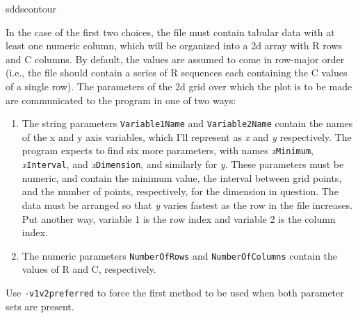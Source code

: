 \begin{sddsprog}{sddscontour}
\begin{itemize}
        In the case of the first two choices, the file must contain
tabular data with at least one numeric column, which will be organized
into a 2d array with R rows and C columns.  By default, the values are
assumed to come in row-major order (i.e., the file should contain a
series of R sequences each containing the C values of a single row).
The parameters of the 2d grid over which the plot is to be made are
communicated to the program in one of two ways:

\begin{enumerate}

\item The string parameters \verb|Variable1Name| and \verb|Variable2Name| contain the names of the
x and y axis variables, which I'll represent as {\em x} and {\em y} respectively.  The program expects to find
six more parameters, with names {\em x}\verb|Minimum|, {\em x}\verb|Interval|, and {\em x}\verb|Dimension|,
and similarly for {\em y}.  These parameters must be numeric, and contain the minimum value, the interval
between grid points, and the number of points, respectively, for the dimension in question.
The data must be arranged so that {\em y} varies fastest as the row in the file increases.  Put another
way, variable 1 is the row index and variable 2 is the column index.
\item The numeric parameters \verb|NumberOfRows| and \verb|NumberOfColumns| contain the values of R and
C, respectively.
\end{enumerate}
Use \verb|-v1v2preferred| to force the first method to be used when both parameter sets are present.


\end{itemize}
\end{sddsprog}
